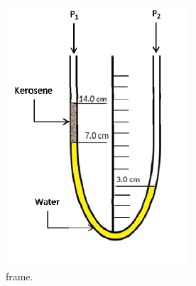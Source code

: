 \documentclass[journal]{IEEEtran}
\begin{document}
\begin{enumerate}
\begin{figure}[h!]
    \centering
    \includegraphics[width=0.65\linewidth]{figs/frame.png}
    \caption{frame.}
    \label{fig:frame}
\end{figure}


\end{enumerate}
\end{document}

